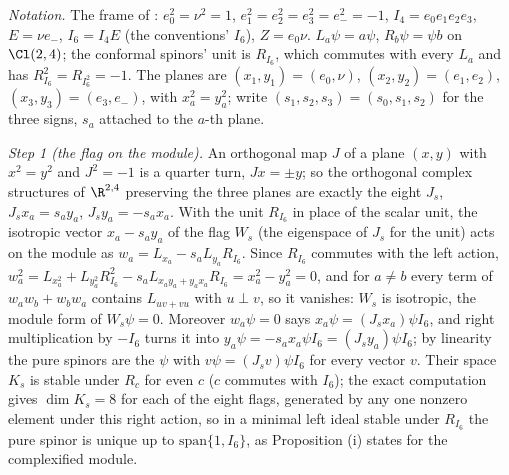\emph{Notation.} The frame of : $e_{0}^{2} = \nu^{2} = 1$, $e_{1}^{2} = e_{2}^{2} = e_{3}^{2} = e_{-}^{2} = -1$, $I_{4} = e_{0}e_{1}e_{2}e_{3}$, $E = \nu e_{-}$, $I_{6} = I_{4}E$ (the conventions' $I_{6}$), $Z = e_{0}\nu$. $L_{a}\psi = a\psi$, $R_{b}\psi = \psi b$ on $\Cl(2,4)$; the conformal spinors' unit is $R_{I_{6}}$, which commutes with every $L_{a}$ and has $R_{I_{6}}^{2} = R_{I_{6}^{2}} = -1$. The planes are $(x_{1}, y_{1}) = (e_{0}, \nu)$, $(x_{2}, y_{2}) = (e_{1}, e_{2})$, $(x_{3}, y_{3}) = (e_{3}, e_{-})$, with $x_{a}^{2} = y_{a}^{2}$; write $(s_{1}, s_{2}, s_{3}) = (s_{0}, s_{1}, s_{2})$ for the three signs, $s_{a}$ attached to the $a$-th plane.

\emph{Step 1 (the flag on the module).} An orthogonal map $J$ of a plane $(x, y)$ with $x^{2} = y^{2}$ and $J^{2} = -1$ is a quarter turn, $Jx = \pm y$; so the orthogonal complex structures of $\R^{2,4}$ preserving the three planes are exactly the eight $J_{s}$, $J_{s}x_{a} = s_{a}y_{a}$, $J_{s}y_{a} = -s_{a}x_{a}$. With the unit $R_{I_{6}}$ in place of the scalar unit, the isotropic vector $x_{a} - s_{a}y_{a}$ of the flag $W_{s}$ (the eigenspace of $J_{s}$ for the unit) acts on the module as $w_{a} = L_{x_{a}} - s_{a}L_{y_{a}}R_{I_{6}}$. Since $R_{I_{6}}$ commutes with the left action, $w_{a}^{2} = L_{x_{a}^{2}} + L_{y_{a}^{2}}R_{I_{6}}^{2} - s_{a}L_{x_{a}y_{a} + y_{a}x_{a}}R_{I_{6}} = x_{a}^{2} - y_{a}^{2} = 0$, and for $a \ne b$ every term of $w_{a}w_{b} + w_{b}w_{a}$ contains $L_{u v + v u}$ with $u \perp v$, so it vanishes: $W_{s}$ is isotropic, the module form of $W_{s}\psi = 0$. Moreover $w_{a}\psi = 0$ says $x_{a}\psi = (J_{s}x_{a})\psi I_{6}$, and right multiplication by $-I_{6}$ turns it into $y_{a}\psi = -s_{a}x_{a}\psi I_{6} = (J_{s}y_{a})\psi I_{6}$; by linearity the pure spinors are the $\psi$ with $v\psi = (J_{s}v)\psi I_{6}$ for every vector $v$. Their space $K_{s}$ is stable under $R_{c}$ for even $c$ ($c$ commutes with $I_{6}$); the exact computation gives $\dim K_{s} = 8$ for each of the eight flags, generated by any one nonzero element under this right action, so in a minimal left ideal stable under $R_{I_{6}}$ the pure spinor is unique up to $\mathrm{span}\{1, I_{6}\}$, as Proposition (i) states for the complexified module.


